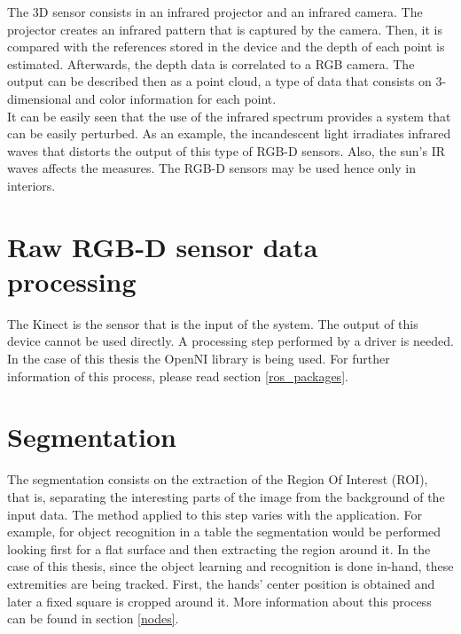 \label{rgb-d}

The 3D sensor consists in an infrared projector and an infrared camera. 
The projector creates an infrared pattern that is captured by the camera.
Then, it is compared with the references stored in the device and the depth of each point is estimated. 
Afterwards, the depth data is correlated to a RGB camera. 
The output can be described then as a point cloud, a type of data that consists on 3-dimensional and color information for each point.  
\\

It can be easily seen that the use of the infrared spectrum provides a system that can be easily perturbed. 
As an example, the incandescent light irradiates infrared waves that distorts the output of this type of RGB-D sensors. 
Also, the sun's IR waves affects the measures. 
The RGB-D sensors may be used hence only in interiors. 




\section{Raw RGB-D sensor data processing}
\label{input_data}
The Kinect is the sensor that is the input of the system. 
The output of this device cannot be used directly. 
A processing step performed by a driver is needed. 
In the case of this thesis the OpenNI library is being used. 
For further information of this process, please read section \ref{ros_packages}.


\section{Segmentation}
\label{segmentation}
The segmentation consists on the extraction of the Region Of Interest (ROI), that is, separating the interesting parts of the image from the background of the input data. 
The method applied to this step varies with the application. 
For example, for object recognition in a table the segmentation would be performed looking first for a flat surface and then extracting the region around it. 
In the case of this thesis, since the object learning and recognition is done in-hand, these extremities are being tracked. 
First, the hands' center position is obtained and later a fixed square is cropped around it. 
More information about this process can be found in section \ref{nodes}.



